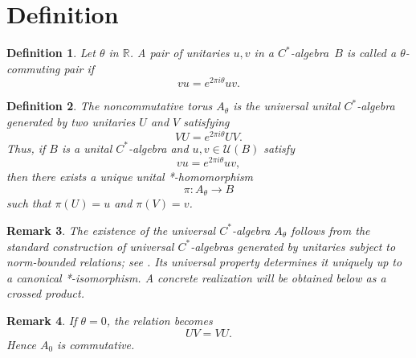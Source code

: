\documentclass{book}
\newtheorem{definition}{Definition}[section]
\newtheorem{remark}[definition]{Remark}
\def\cstar{\(C^*\)-algebra}
\begin{document}
\section{Definition}
\begin{definition}
Let \(\theta\) in \(\mathbb R\).
A pair of unitaries \(u,v\) in a \cstar\ \(B\) is called
a \textnormal{\(\theta\)-commuting pair} if
\[
vu=e^{2\pi i\theta}uv.
\]
\end{definition}
\begin{definition}
The \textnormal{noncommutative torus} \(A_\theta\) is the universal unital \(C^*\)-algebra generated by two unitaries
\(U\) and \(V\) satisfying
\[
VU=e^{2\pi i\theta}UV.
\]
Thus, if \(B\) is a unital \(C^*\)-algebra and \(u,v\in\mathcal U(B)\)
satisfy
\[
vu=e^{2\pi i\theta}uv,
\]
then there exists a unique unital *-homomorphism
\[
\pi:A_\theta\longrightarrow B
\]
such that \(\pi(U)=u\) and \(\pi(V)=v\).
\end{definition}
\begin{remark}
The existence of the universal \(C^*\)-algebra \(A_\theta\) follows
from the standard construction of universal \(C^*\)-algebras generated
by unitaries subject to norm-bounded relations; see \cite[Chapter~VI, Section~1]{Davidson1996}. Its universal property
determines it uniquely up to a canonical *-isomorphism.
A concrete realization will be obtained below as a crossed product.
\end{remark}
\begin{remark}
If \(\theta=0\), the relation becomes
\[
UV=VU.
\]
Hence \(A_0\) is commutative.
\end{remark}
\end{document}
